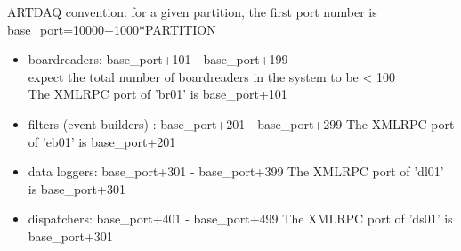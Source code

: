 ARTDAQ convention: for a given partition, the first port number is base\_port=10000+1000*PARTITION
\begin{itemize}
\item
  boardreaders: base\_port+101 - base\_port+199\\
  expect the total number of boardreaders in the system to be < 100 \\
  The XMLRPC port of 'br01' is base\_port+101
\item
  filters (event builders) : base\_port+201 - base\_port+299
  The XMLRPC port of 'eb01' is base\_port+201
\item
  data loggers: base\_port+301 - base\_port+399
  The XMLRPC port of 'dl01' is base\_port+301
\item
  dispatchers: base\_port+401 - base\_port+499
  The XMLRPC port of 'ds01' is base\_port+301
\end{itemize}

